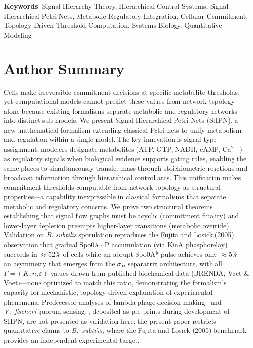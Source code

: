 \documentclass[10pt,letterpaper]{article}
\begin{document}
\vspace{6pt}
\noindent\textbf{Keywords:} Signal Hierarchy Theory, Hierarchical Control Systems, Signal Hierarchical Petri Nets, Metabolic-Regulatory Integration, Cellular Commitment, Topology-Driven Threshold Computation, Systems Biology, Quantitative Modeling

\section*{Author Summary}

Cells make irreversible commitment decisions at specific metabolite thresholds, yet computational models cannot predict these values from network topology alone because existing formalisms separate metabolic and regulatory networks into distinct sub-models. We present Signal Hierarchical Petri Nets (SHPN), a new mathematical formalism extending classical Petri nets to unify metabolism and regulation within a single model. The key innovation is signal type assignment: modelers designate metabolites (ATP, GTP, NADH, cAMP, Ca$^{2+}$) as regulatory signals when biological evidence supports gating roles, enabling the same places to simultaneously transfer mass through stoichiometric reactions and broadcast information through hierarchical control arcs. This unification makes commitment thresholds computable from network topology as structural properties---a capability inexpressible in classical formalisms that separate metabolic and regulatory concerns. We prove two structural theorems establishing that signal flow graphs must be acyclic (commitment finality) and lower-layer depletion preempts higher-layer transitions (metabolic override). Validation on \textit{B. subtilis} sporulation reproduces the Fujita and Losick (2005) observation that gradual Spo0A$\sim$P accumulation (via KinA phosphorelay) succeeds in $\approx 52\%$ of cells while an abrupt Spo0A* pulse achieves only $\approx 5\%$---an asymmetry that emerges from the $\sigma_H$ separatrix architecture, with all $\Gamma = (K, n, \varepsilon)$ values drawn from published biochemical data (BRENDA, Voet \& Voet)---none optimized to match this ratio, demonstrating the formalism's capacity for mechanistic, topology-driven explanation of experimental phenomena. Predecessor analyses of lambda phage decision-making~\cite{simao2024hierarchical} and \textit{V.\ fischeri} quorum sensing~\cite{simao2025unifying}, deposited as pre-prints during development of SHPN, are not presented as validation here; the present paper restricts quantitative claims to \textit{B.\ subtilis}, where the Fujita and Losick (2005) benchmark provides an independent experimental target.
\end{document}
